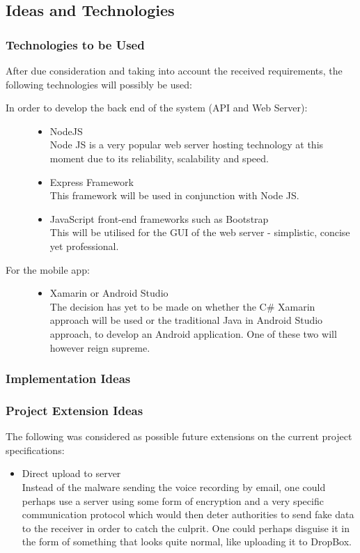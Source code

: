 \subsection{Ideas and Technologies}
\subsubsection{Technologies to be Used}
After due consideration and taking into account the received requirements, the following technologies will possibly be used:
\begin{description}
	\item[In order to develop the back end of the system (API and Web Server):]
		\begin{itemize}
			\item{NodeJS}\hfill\\
			Node JS is a very popular web server hosting technology at this moment due 
			to its reliability, scalability and speed.
			\item{Express Framework}\hfill\\
			This framework will be used in conjunction with Node JS.
			\item{JavaScript front-end frameworks such as Bootstrap}\hfill\\
			This will be utilised for the GUI of the web server - simplistic, concise yet professional.
		\end{itemize}		
		
	\item[For the mobile app:]\hfill
	\begin{itemize}
		\item{Xamarin or Android Studio}\hfill\\
		The decision has yet to be made on whether the C\# Xamarin approach will be used or the traditional Java in Android Studio approach, to develop an Android application. One of these two will however reign supreme.
	\end{itemize}
		
	
\end{description}
	
\subsubsection{Implementation Ideas}	

	
\subsubsection{Project Extension Ideas}
The following was considered as possible future extensions on the current project specifications:

\begin{itemize}
	\item Direct upload to server\\
	Instead of the malware sending the voice recording by email, one could perhaps use a server using some form of encryption and a very specific communication protocol which would then deter authorities to send fake data to the receiver in order to catch the culprit. One could perhaps disguise it in the form of something that looks quite normal, like uploading it to DropBox.
	
\end{itemize}